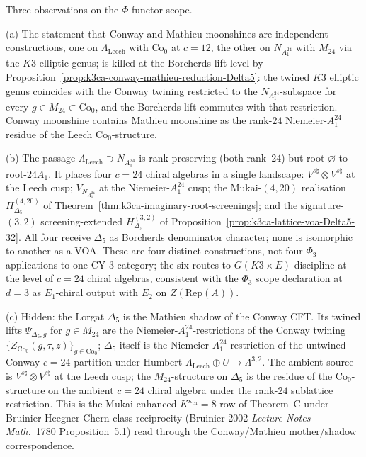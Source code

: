 \begin{remark}
\label{rmk:k3ca-conway-contains-mathieu-Delta5-shadow}
Three observations on the $\Phi$-functor scope.

(a) The statement that Conway and Mathieu moonshines are independent
constructions, one on $\Lambda_{\mathrm{Leech}}$ with
$\mathrm{Co}_0$ at $c=12$, the other on $N_{A_1^{24}}$ with $M_{24}$
via the $K3$ elliptic genus; is killed at the Borcherds-lift
level by Proposition~\ref{prop:k3ca-conway-mathieu-reduction-Delta5}:
the twined $K3$ elliptic genus coincides with the Conway twining
restricted to the $N_{A_1^{24}}$-subspace for every
$g\in M_{24}\subset\mathrm{Co}_0$, and the Borcherds lift commutes
with that restriction. Conway moonshine contains Mathieu moonshine
as the rank-$24$ Niemeier-$A_1^{24}$ residue of the Leech
$\mathrm{Co}_0$-structure.

(b) The passage $\Lambda_{\mathrm{Leech}}\supset N_{A_1^{24}}$ is
rank-preserving (both rank~$24$) but root-$\varnothing$-to-root-$24A_1$.
It places four $c=24$ chiral algebras in a single landscape:
$V^{s\natural}\otimes V^{s\natural}$ at the Leech cusp;
$V_{N_{A_1^{24}}}$ at the Niemeier-$A_1^{24}$ cusp; the
Mukai-$(4,20)$ realisation $H_{\Delta_5}^{(4,20)}$ of
Theorem~\ref{thm:k3ca-imaginary-root-screenings}; and the
signature-$(3,2)$ screening-extended $H_{\Delta_5}^{(3,2)}$ of
Proposition~\ref{prop:k3ca-lattice-voa-Delta5-32}. All four receive
$\Delta_5$ as Borcherds denominator character; none is isomorphic to
another as a VOA. These are four distinct constructions, not four
$\Phi_3$-applications to one CY-$3$ category; the
six-routes-to-$G(K3\times E)$ discipline at the level of $c=24$
chiral algebras, consistent with the $\Phi_3$ scope declaration at
$d=3$ as $E_1$-chiral output with $E_2$ on $Z(\mathrm{Rep}(A))$.

(c) Hidden: the Lorgat $\Delta_5$ is the Mathieu shadow of the
Conway CFT. Its twined lifts $\Psi_{\Delta_5,g}$ for $g\in M_{24}$
are the Niemeier-$A_1^{24}$-restrictions of the Conway twining
$\{Z_{\mathrm{Co}_0}(g,\tau,z)\}_{g\in\mathrm{Co}_0}$; $\Delta_5$
itself is the Niemeier-$A_1^{24}$-restriction of the untwined
Conway $c=24$ partition under Humbert
$\Lambda_{\mathrm{Leech}}\oplus U\to\Lambda^{3,2}$. The ambient
source is $V^{s\natural}\otimes V^{s\natural}$ at the Leech cusp;
the $M_{24}$-structure on $\Delta_5$ is the residue of the
$\mathrm{Co}_0$-structure on the ambient $c=24$ chiral algebra
under the rank-$24$ sublattice restriction. This is the
Mukai-enhanced $K^{\kappa_{\mathrm{ch}}}=8$ row of Theorem~C under
Bruinier Heegner Chern-class reciprocity
(Bruinier 2002 \emph{Lecture Notes Math.}~1780 Proposition~5.1)
read through the Conway/Mathieu mother/shadow correspondence.


\end{remark}
